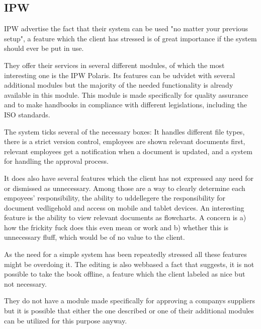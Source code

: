 \subsection{IPW}
IPW advertise the fact that their system can be used "no matter your previous setup", a feature which the client has stressed is of great importance if the system should ever be put in use.

They offer their services in several different modules, of which the most interesting one is the IPW Polaris. 
Its features can be udvidet with several additional modules but the majority of the needed functionality is already available in this module.
This module is made specifically for quality assurance and to make handbooks in compliance with different legislations, including the ISO standards.

The system ticks several of the necessary boxes: It handles different file types, there is a strict version control, employees are shown relevant documents first, relevant employees get a notification when a document is updated, and a system for handling the approval process.

It does also have several features which the client has not expressed any need for or dismissed as unnecessary. 
Among those are a way to clearly determine each empoyees' responsibility, the ability to uddellegere the responsibility for document vedligehold and access on mobile and tablet devices. 
An interesting feature is the ability to view relevant documents as flowcharts. 
A concern is a) how the frickity fuck does this even mean or work and b) whether this is unnecessary fluff, which would be of no value to the client.

As the need for a simple system has been repeatedly stressed all these features might be overdoing it.
The editing is also webbased a fact that suggests, it is not possible to take the book offline, a feature which the client labeled as nice but not necessary.

They do not have a module made specifically for approving a companys suppliers but it is possible that either the one described or one of their additional modules can be utilized for this purpose anyway.